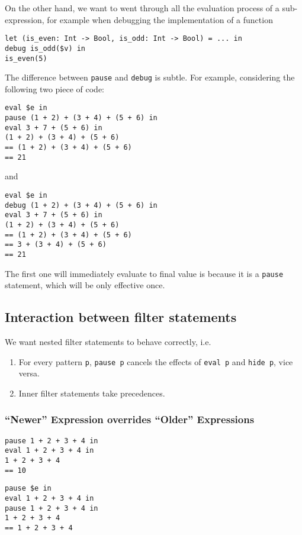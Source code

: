 On the other hand, we want to went through all the evaluation process of a
sub-expression, for example when debugging the implementation of a function
\begin{verbatim}
let (is_even: Int -> Bool, is_odd: Int -> Bool) = ... in
debug is_odd($v) in
is_even(5)
\end{verbatim}

The difference between \verb|pause| and \verb|debug| is subtle. For
example, considering the following two piece of code:
\begin{verbatim}
eval $e in
pause (1 + 2) + (3 + 4) + (5 + 6) in
eval 3 + 7 + (5 + 6) in
(1 + 2) + (3 + 4) + (5 + 6)
== (1 + 2) + (3 + 4) + (5 + 6)
== 21
\end{verbatim}
and
\begin{verbatim}
eval $e in
debug (1 + 2) + (3 + 4) + (5 + 6) in
eval 3 + 7 + (5 + 6) in
(1 + 2) + (3 + 4) + (5 + 6)
== (1 + 2) + (3 + 4) + (5 + 6)
== 3 + (3 + 4) + (5 + 6)
== 21
\end{verbatim}
The first one will immediately evaluate to final value is because it is a \verb|pause| statement, which will be only effective once.

\subsection{Interaction between filter statements}


We want nested filter statements to behave correctly, i.e.
\begin{enumerate}
\item For every pattern \verb|p|, \verb|pause p| cancels the effects
  of \verb|eval p| and \verb|hide p|, vice versa.
\item Inner filter statements take precedences.
\end{enumerate}

\subsubsection{``Newer'' Expression overrides ``Older'' Expressions}

\begin{verbatim}
pause 1 + 2 + 3 + 4 in
eval 1 + 2 + 3 + 4 in
1 + 2 + 3 + 4
== 10
\end{verbatim}

\begin{verbatim}
pause $e in
eval 1 + 2 + 3 + 4 in
pause 1 + 2 + 3 + 4 in
1 + 2 + 3 + 4
== 1 + 2 + 3 + 4
\end{verbatim}

